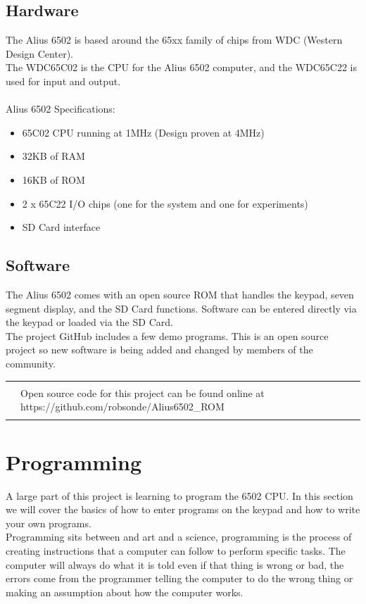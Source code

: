 \documentclass{ol-softwaremanual}
\newcommand{\Note}[1]{
\begin{table}[h]
\begin{tabular}{|p{0.1\textwidth}p{0.8\textwidth}|}
\hline
 & \\
\multicolumn{1}{|r}{\Huge\warning} & #1\\
 &  \\ \hline
\end{tabular}
\end{table}
}
\begin{document}
\subsection{Hardware}
The Alius 6502 is based around the 65xx family of chips from WDC (Western Design Center).\\

The WDC65C02 is the CPU for the Alius 6502 computer, and the WDC65C22 is used for input and output.\\
\\
Alius 6502 Specifications:
\begin{itemize}
    \item 65C02 CPU running at 1MHz (Design proven at 4MHz)
    \item 32KB of RAM
    \item 16KB of ROM
    \item 2 x 65C22 I/O chips (one for the system and one for experiments)
    \item SD Card interface
\end{itemize}


\subsection{Software}
The Alius 6502 comes with an open source ROM that handles the keypad, seven segment display, and the SD Card functions.  Software can be entered directly via the keypad or loaded via the SD Card.\\

The project GitHub includes a few demo programs. This is an open source project so new software is being added and changed by members of the community.\\

\Note{Open source code for this project can be found online at https://github.com/robsonde/Alius6502\_ROM}

\pagebreak

\section{Programming}
A large part of this project is learning to program the 6502 CPU. In this section we will cover the basics of how to enter programs on the keypad and how to write your own programs.\\

Programming sits between and art and a science, programming is the process of creating instructions that a computer can follow to perform specific tasks. The computer will always do what it is told even if that thing is wrong or bad, the errors come from the programmer telling the computer to do the wrong thing or making an assumption about how the computer works.\\
\end{document}

